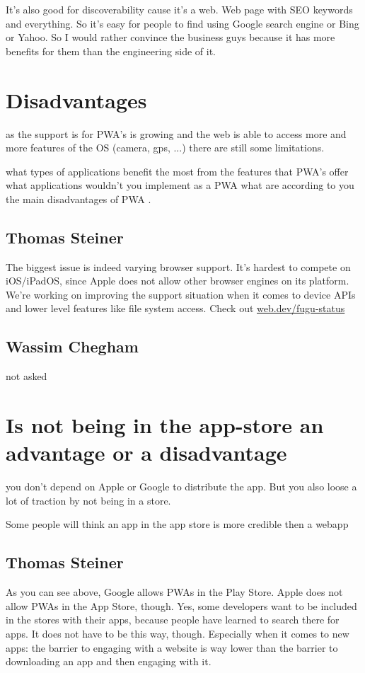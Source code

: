 			It's also good for discoverability cause it's a web. Web page with SEO keywords and everything. So it's easy for people to find using Google search engine or Bing or Yahoo. So I would rather convince the business guys because it has more benefits for them than the engineering side of it.
			
	\section{Disadvantages}
	
		as the support is for PWA's is growing and the web is able to access more and more features of the OS (camera, gps, ...) there are still some limitations. 
		
		what types of applications benefit the most from the features that PWA's offer what applications wouldn't you implement as a PWA what are according to you the main disadvantages of PWA .
		
		\subsection{Thomas Steiner}
		
			The biggest issue is indeed varying browser support. It’s hardest to compete on iOS/iPadOS, since Apple does not allow other browser engines on its platform. We’re working on improving the support situation when it comes to device APIs and lower level features like file system access. Check out	\href{https://web.dev/fugu-status/}{web.dev/fugu-status}

		\subsection{Wassim Chegham}
			not asked
			


	\section{Is not being in the app-store an advantage or a disadvantage}
		
		you don't depend on Apple or Google to distribute the app. But you also loose a lot of traction by not being in a store.
		
		Some people will think an app in the app store is more credible then a webapp
			
		\subsection{Thomas Steiner}
			As you can see above, Google allows PWAs in the Play Store. Apple does not allow PWAs in the App Store, though. Yes, some developers want to be included in the stores with their apps, because people have learned to search there for apps. It does not have to be this way, though. Especially when it comes to new apps: the barrier to engaging with a website is way lower than the barrier to downloading an app and then engaging with it.
			
